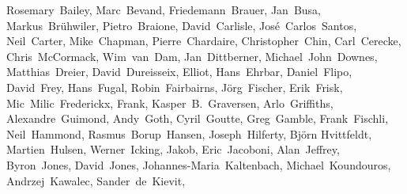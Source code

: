 { \flushleft\small
Rosemary~Bailey,        %
Marc~Bevand,            %
Friedemann~Brauer,      %
Jan~Busa,               %
Markus~Br\"uhwiler,     %
Pietro~Braione,         %
David~Carlisle,         %
Jos\'e~Carlos~Santos,   %
Neil~Carter,            %
Mike~Chapman,           %
Pierre~Chardaire,       %
Christopher~Chin,       %
Carl~Cerecke,           %
Chris~McCormack,        %
Wim~van~Dam,            %
Jan~Dittberner,         %
Michael~John~Downes,    %
Matthias~Dreier,        %
David~Dureisseix,       %
Elliot,                 %
Hans~Ehrbar,            %
Daniel~Flipo,           %
David~Frey,             %
Hans~Fugal,             %
Robin~Fairbairns,       %
J\"org~Fischer,        %
Erik~Frisk,             %
Mic~Milic~Frederickx,   %
Frank,                  %
Kasper~B.~Graversen,    %
Arlo~Griffiths,         %
Alexandre~Guimond,      %
Andy~Goth,              %
Cyril~Goutte,           %
Greg~Gamble,            %
Frank~Fischli,          %
Neil~Hammond,           %
Rasmus~Borup~Hansen,    %
Joseph~Hilferty,        %
Bj\"orn Hvittfeldt,     %
Martien~Hulsen,         %
Werner~Icking,          %
Jakob,                  %
Eric~Jacoboni,          %
Alan~Jeffrey,           %
Byron~Jones,            %
David~Jones,            %
Johannes-Maria~Kaltenbach, %
Michael~Koundouros,     %
Andrzej~Kawalec,        %
Sander~de~Kievit,       %
}
